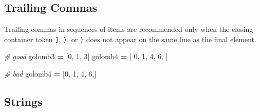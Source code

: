\documentclass[
]{book}
\newenvironment{Shaded}{\begin{snugshade}}{\end{snugshade}}
\newcommand{\CommentTok}[1]{\textcolor[rgb]{0.56,0.35,0.01}{\textit{#1}}}
\newcommand{\DecValTok}[1]{\textcolor[rgb]{0.00,0.00,0.81}{#1}}
\newcommand{\NormalTok}[1]{#1}
\newcommand{\OperatorTok}[1]{\textcolor[rgb]{0.81,0.36,0.00}{\textbf{#1}}}
\begin{document}
\hypertarget{trailing-commas}{%
\subsection{Trailing Commas}\label{trailing-commas}}

Trailing commas in sequences of items are recommended only when the closing
container token \texttt{{]}}, \texttt{)}, or \texttt{\}} does not appear on the same line as the final
element.

\begin{Shaded}
\begin{Highlighting}[]
\CommentTok{# good}
\NormalTok{golomb3 }\OperatorTok{=}\NormalTok{ [}\DecValTok{0}\NormalTok{, }\DecValTok{1}\NormalTok{, }\DecValTok{3}\NormalTok{]}
\NormalTok{golomb4 }\OperatorTok{=}\NormalTok{ [}
    \DecValTok{0}\NormalTok{,}
    \DecValTok{1}\NormalTok{,}
    \DecValTok{4}\NormalTok{,}
    \DecValTok{6}\NormalTok{,}
\NormalTok{]}

\CommentTok{# bad}
\NormalTok{golomb4 }\OperatorTok{=}\NormalTok{ [}\DecValTok{0}\NormalTok{, }\DecValTok{1}\NormalTok{, }\DecValTok{4}\NormalTok{, }\DecValTok{6}\NormalTok{,]}
\end{Highlighting}
\end{Shaded}

\hypertarget{strings}{%
\subsection{Strings}\label{strings}}
\end{document}
